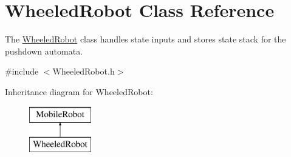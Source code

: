 \hypertarget{class_wheeled_robot}{}\section{Wheeled\+Robot Class Reference}
\label{class_wheeled_robot}


The \mbox{\hyperlink{class_wheeled_robot}{Wheeled\+Robot}} class handles state inputs and stores state stack for the pushdown automata.  




{\ttfamily \#include $<$Wheeled\+Robot.\+h$>$}

Inheritance diagram for Wheeled\+Robot\+:\begin{figure}[H]
\begin{center}
\leavevmode
\includegraphics[height=2.000000cm]{class_wheeled_robot}
\end{center}
\end{figure}

